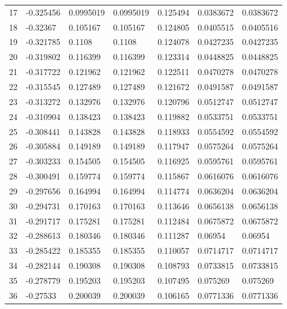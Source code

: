 \begin{longtable}{l|lll|lll}
  17 & -0.325456    & 0.0995019   & 0.0995019   &  0.125494    & 0.0383672   & 0.0383672   \\
  18 & -0.32367     & 0.105167    & 0.105167    &  0.124805    & 0.0405515   & 0.0405516   \\
  19 & -0.321785    & 0.1108      & 0.1108      &  0.124078    & 0.0427235   & 0.0427235   \\
  20 & -0.319802    & 0.116399    & 0.116399    &  0.123314    & 0.0448825   & 0.0448825   \\
  21 & -0.317722    & 0.121962    & 0.121962    &  0.122511    & 0.0470278   & 0.0470278   \\
  22 & -0.315545    & 0.127489    & 0.127489    &  0.121672    & 0.0491587   & 0.0491587   \\
  23 & -0.313272    & 0.132976    & 0.132976    &  0.120796    & 0.0512747   & 0.0512747   \\
  24 & -0.310904    & 0.138423    & 0.138423    &  0.119882    & 0.0533751   & 0.0533751   \\
  25 & -0.308441    & 0.143828    & 0.143828    &  0.118933    & 0.0554592   & 0.0554592   \\
  26 & -0.305884    & 0.149189    & 0.149189    &  0.117947    & 0.0575264   & 0.0575264   \\
  27 & -0.303233    & 0.154505    & 0.154505    &  0.116925    & 0.0595761   & 0.0595761   \\
  28 & -0.300491    & 0.159774    & 0.159774    &  0.115867    & 0.0616076   & 0.0616076   \\
  29 & -0.297656    & 0.164994    & 0.164994    &  0.114774    & 0.0636204   & 0.0636204   \\
  30 & -0.294731    & 0.170163    & 0.170163    &  0.113646    & 0.0656138   & 0.0656138   \\
  31 & -0.291717    & 0.175281    & 0.175281    &  0.112484    & 0.0675872   & 0.0675872   \\
  32 & -0.288613    & 0.180346    & 0.180346    &  0.111287    & 0.06954     & 0.06954     \\
  33 & -0.285422    & 0.185355    & 0.185355    &  0.110057    & 0.0714717   & 0.0714717   \\
  34 & -0.282144    & 0.190308    & 0.190308    &  0.108793    & 0.0733815   & 0.0733815   \\
  35 & -0.278779    & 0.195203    & 0.195203    &  0.107495    & 0.075269    & 0.075269    \\
  36 & -0.27533     & 0.200039    & 0.200039    &  0.106165    & 0.0771336   & 0.0771336   \\

\end{longtable}
